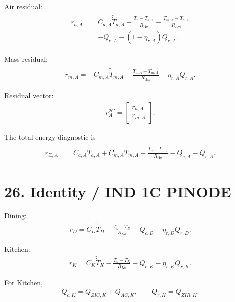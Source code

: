 \documentclass[11pt]{article}
\begin{document}
Air residual:
\begin{align}
\boxed{
\begin{aligned}
r_{a,A}
={}&
C_{a,A}\widetilde{\dot T}_{a,A}
-
\frac{T_o-T_{a,A}}{R_{Ao}}
-
\frac{T_{m,A}-T_{a,A}}{R_{Am}}
\\
&-
Q_{c,A}
-
(1-\eta_{r,A})Q_{r,A}.
\end{aligned}
}
\tag{P4.105}
\end{align}

Mass residual:
\begin{align}
\boxed{
\begin{aligned}
r_{m,A}
={}&
C_{m,A}\widetilde{\dot T}_{m,A}
-
\frac{T_{a,A}-T_{m,A}}{R_{Am}}
-
\eta_{r,A}Q_{r,A}.
\end{aligned}
}
\tag{P4.106}
\end{align}

Residual vector:
\begin{align}
\boxed{
r_A^{2C}
=
\begin{bmatrix}
r_{a,A}\\r_{m,A}
\end{bmatrix}.
}
\tag{P4.107}
\end{align}

The total-energy diagnostic is
\begin{align}
\boxed{
\begin{aligned}
r_{\Sigma,A}
=
{}&
C_{a,A}\widetilde{\dot T}_{a,A}
+
C_{m,A}\widetilde{\dot T}_{m,A}
-
\frac{T_o-T_{a,A}}{R_{Ao}}
-
Q_{c,A}
-
Q_{r,A}.
\end{aligned}
}
\tag{P4.108}
\end{align}

\section*{26. Identity / IND 1C PINODE}

Dining:
\begin{align}
\boxed{
r_D
=
C_D\widetilde{\dot T}_D
-
\frac{T_o-T_D}{R_{Do}}
-
Q_{c,D}
-
\eta_{r,D}Q_{r,D}.
}
\tag{P4.109}
\end{align}

Kitchen:
\begin{align}
\boxed{
r_K
=
C_K\widetilde{\dot T}_K
-
\frac{T_o-T_K}{R_{Ko}}
-
Q_{c,K}
-
\eta_{r,K}Q_{r,K}.
}
\tag{P4.110}
\end{align}

For Kitchen,
\begin{align}
\boxed{
Q_{c,K}=Q_{ZIC,K}+Q_{AC,K},
\qquad
Q_{r,K}=Q_{ZIR,K}.
}
\tag{P4.111}
\end{align}
\end{document}
